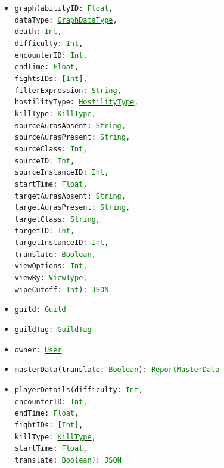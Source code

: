\documentclass[10pt, a4paper]{memoir}
\numberwithin{equation}{section}
\theoremstyle{plain}
\theoremstyle{defp}
\theoremstyle{dotless}
\theoremstyle{definition}
\theoremstyle{dotless}
\theoremstyle{dotless}
\theoremstyle{defp}
\theoremstyle{defp}
\theoremstyle{be}          %
\theoremstyle{defp}
\newcommand\ttt[1]{\texttt{#1}}
\newcommand\type[1]{\ttt{\textcolor{green}{#1}}}
\begin{document}
\begin{itemize}[noitemsep,topsep=1pt]
\begin{itemize}[itemsep=1pt,topsep=1pt]
		\item \ttt{graph(abilityID: \type{Float}, \\dataType: \hyperref[sec:GraphDataType]{\type{GraphDataType}}, \\death: \type{Int}, \\difficulty: \type{Int}, \\encounterID: \type{Int}, \\endTime: \type{Float}, \\fightsIDs: [\type{Int}], \\ filterExpression: \type{String}, \\hostilityType: \hyperref[sec:HostilityType]{\type{HostilityType}}, \\killType: \hyperref[sec:KillType]{\type{KillType}}, \\sourceAurasAbsent: \type{String}, \\sourceAurasPresent: \type{String}, \\sourceClass: \type{Int}, \\sourceID: \type{Int}, \\sourceInstanceID: \type{Int}, \\startTime: \type{Float}, \\targetAurasAbsent: \type{String}, \\targetAurasPresent: \type{String}, \\targetClass: \type{String}, \\targetID: \type{Int}, \\targetInstanceID: \type{Int}, \\translate: \type{Boolean}, \\viewOptions: \type{Int}, \\viewBy: \hyperref[sec:ViewType]{\type{ViewType}}, \\wipeCutoff: \type{Int}): \type{JSON}}
		\item \ttt{guild: \type{Guild}}
		\item \ttt{guildTag: \type{GuildTag}}
		\item \ttt{owner: \hyperref[sec:User]{\type{User}}}
		\item \ttt{masterData(translate: \type{Boolean}): \type{ReportMasterData}}
		\item \ttt{playerDetails(difficulty: \type{Int}, \\encounterID: \type{Int}, \\endTime: \type{Float}, \\fightIDs: [\type{Int}], \\killType: \hyperref[sec:KillType]{\type{KillType}}, \\startTime: \type{Float}, \\translate: \type{Boolean}): \type{JSON}}

\end{itemize}
\end{itemize}
\end{document}
